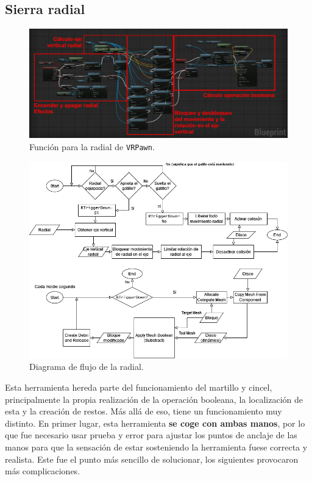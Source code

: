 \subsection{Sierra radial}

\begin{figure}[H]
	\centering
	\includegraphics[width=12.5cm]{imagenes/radial}
	\caption{Función para la radial de \texttt{VRPawn}.}
	\label{fig:radial}
\end{figure}

\begin{figure}[H]
	\centering
	\includegraphics[width=12.2cm]{imagenes/flowchart4}
	\caption{Diagrama de flujo de la radial.}
	\label{fig:fc4}
\end{figure}

Esta herramienta hereda parte del funcionamiento del martillo y cincel, principalmente la propia realización de la operación booleana, la localización de esta y la creación de restos. Más allá de eso, tiene un funcionamiento muy distinto. En primer lugar, esta herramienta \textbf{se coge con ambas manos}, por lo que fue necesario usar prueba y error para ajustar los puntos de anclaje de las manos para que la sensación de estar sosteniendo la herramienta fuese correcta y realista. Este fue el punto más sencillo de solucionar, los siguientes provocaron más complicaciones.


